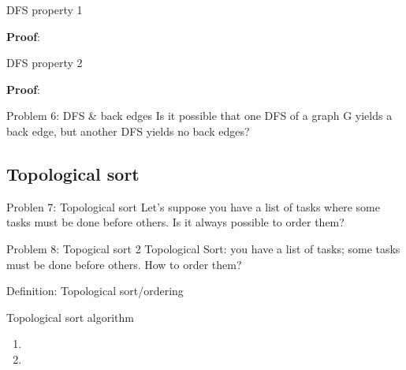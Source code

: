 \documentclass{article}
\begin{document}
\begin{theorem}{DFS property 1}
    \vspace{8mm}
\end{theorem}

\textbf{Proof}:

\vspace{4cm}

\begin{theorem}{DFS property 2}
      \vspace{8mm}
\end{theorem}

\textbf{Proof}:

\vspace{4cm}


\begin{problem}{Problem 6: DFS \& back edges}
    Is it possible that one DFS of a graph G yields a back edge, but another DFS yields no back edges?
\end{problem}



\newpage
\subsection{Topological sort}

\begin{problem}{Problen 7: Topological sort}
    Let's suppose you have a list of tasks where some tasks must be done before others. Is it always possible to order them?
\end{problem}

\vspace{2cm}


\begin{problem}{Problem 8: Topogical sort 2}
    Topological Sort: you have a list of tasks; some tasks must be done before others. How to order them?
\end{problem}

\vspace{2cm} 

\begin{definition}{Definition: Topological sort/ordering}
    \vspace{8mm}
\end{definition}


\begin{strategy}{Topological sort algorithm}
    \begin{enumerate}
        \item 
        \item 
    \end{enumerate}   
\end{strategy}
\end{document}
